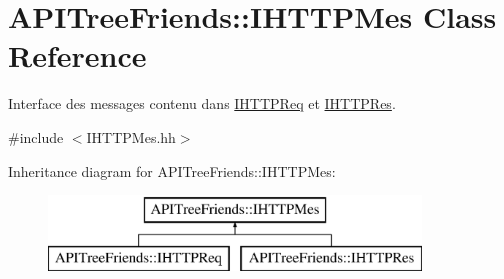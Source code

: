 \hypertarget{class_a_p_i_tree_friends_1_1_i_h_t_t_p_mes}{}\section{A\+P\+I\+Tree\+Friends\+:\+:I\+H\+T\+T\+P\+Mes Class Reference}
\label{class_a_p_i_tree_friends_1_1_i_h_t_t_p_mes}


Interface des messages contenu dans \hyperlink{class_a_p_i_tree_friends_1_1_i_h_t_t_p_req}{I\+H\+T\+T\+P\+Req} et \hyperlink{class_a_p_i_tree_friends_1_1_i_h_t_t_p_res}{I\+H\+T\+T\+P\+Res}.  




{\ttfamily \#include $<$I\+H\+T\+T\+P\+Mes.\+hh$>$}

Inheritance diagram for A\+P\+I\+Tree\+Friends\+:\+:I\+H\+T\+T\+P\+Mes\+:\begin{figure}[H]
\begin{center}
\leavevmode
\includegraphics[height=2.000000cm]{class_a_p_i_tree_friends_1_1_i_h_t_t_p_mes}
\end{center}
\end{figure}
